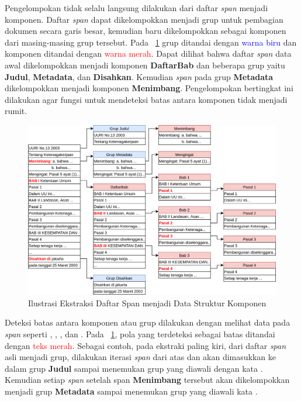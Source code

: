 Pengelompokan tidak selalu langsung dilakukan dari daftar \textit{span} menjadi komponen. Daftar
\textit{span} dapat dikelompokkan menjadi grup untuk pembagian dokumen secara garis besar, kemudian
baru dikelompokkan sebagai komponen dari masing-masing grup tersebut. Pada
\pic~\ref{fig:ilustrasi-ekstraksi} grup ditandai dengan \textcolor{blue}{warna biru} dan komponen
ditandai dengan \textcolor{red}{warna merah}. Dapat dilihat bahwa daftar \textit{span} data awal
dikelompokkan menjadi komponen \textbf{DaftarBab} dan beberapa grup yaitu \textbf{Judul},
\textbf{Metadata}, dan \textbf{Disahkan}. Kemudian \textit{span} pada grup \textbf{Metadata} dikelompokkan
menjadi komponen \textbf{Menimbang}. Pengelompokan bertingkat ini dilakukan agar fungsi untuk
mendeteksi batas antara komponen tidak menjadi rumit.

\begin{figure}[H]
  \centering
  \includegraphics[width=\textwidth]{pictures/pdf_to_component.png}
  \caption{Ilustrasi Ekstraksi Daftar Span menjadi Data Struktur Komponen}
  \label{fig:ilustrasi-ekstraksi}
\end{figure}

Deteksi batas antara komponen atau grup dilakukan dengan melihat data pada \textit{span}
seperti , , , dan . Pada \pic~\ref{fig:ilustrasi-ekstraksi},
pola yang terdeteksi sebagai batas ditandai dengan \textcolor{red}{teks merah}. Sebagai contoh, pada
ekstraki paling kiri, dari daftar \textit{span} asli menjadi grup, dilakukan iterasi
\textit{span} dari atas dan akan dimasukkan ke dalam grup \textbf{Judul} sampai menemukan
grup yang diawali dengan kata . Kemudian setiap \textit{span} setelah
span \textbf{Menimbang} tersebut akan dikelompokkan menjadi grup \textbf{Metadata} sampai
menemukan grup yang diawali kata .

